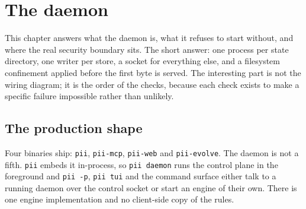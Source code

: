\chapter{The daemon}

\label{ch:daemon}

This chapter answers what the daemon is, what it refuses to start without, and where the real
security boundary sits. The short answer: one process per state directory, one writer per
store, a socket for everything else, and a filesystem confinement applied before the first
byte is served. The interesting part is not the wiring diagram; it is the order of the checks,
because each check exists to make a specific failure impossible rather than unlikely.

\section{The production shape}

Four binaries ship: \texttt{pii}, \texttt{pii-mcp}, \texttt{pii-web} and \texttt{pii-evolve}.
The daemon is not a fifth. \texttt{pii} embeds it in-process, so \texttt{pii daemon} runs the
control plane in the foreground and \texttt{pii -p}, \texttt{pii tui} and the command surface
either talk to a running daemon over the control socket or start an engine of their own. There
is one engine implementation and no client-side copy of the rules.

\begin{center}
\end{center}

